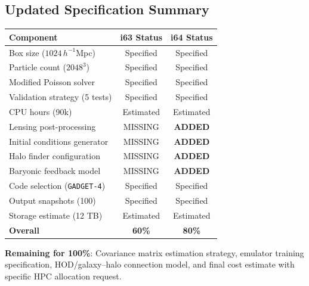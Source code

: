 \documentclass[11pt,a4paper]{article}
\begin{document}
\subsection{Updated Specification Summary}

\begin{center}
\begin{tabular}{lcc}
\toprule
\textbf{Component} & \textbf{i63 Status} & \textbf{i64 Status} \\
\midrule
Box size ($1024\,h^{-1}$Mpc) & Specified & Specified \\
Particle count ($2048^3$) & Specified & Specified \\
Modified Poisson solver & Specified & Specified \\
Validation strategy (5 tests) & Specified & Specified \\
CPU hours (90k) & Estimated & Estimated \\
Lensing post-processing & MISSING & \textbf{ADDED} \\
Initial conditions generator & MISSING & \textbf{ADDED} \\
Halo finder configuration & MISSING & \textbf{ADDED} \\
Baryonic feedback model & MISSING & \textbf{ADDED} \\
Code selection (\texttt{GADGET-4}) & Specified & Specified \\
Output snapshots (100) & Specified & Specified \\
Storage estimate (12 TB) & Estimated & Estimated \\
\midrule
\textbf{Overall} & \textbf{60\%} & \textbf{80\%} \\
\bottomrule
\end{tabular}
\end{center}

\textbf{Remaining for 100\%}: Covariance matrix estimation strategy, emulator training specification, HOD/galaxy--halo connection model, and final cost estimate with specific HPC allocation request.
\end{document}
